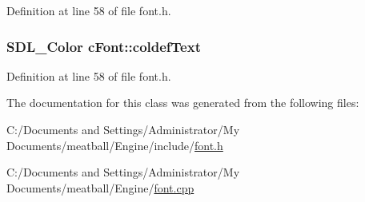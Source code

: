 Definition at line 58 of file font.\-h.

\hypertarget{classc_font_a96a95a892c62f8097c0da7388bc7b948}{
\subsubsection[{coldef\-Text}]{\setlength{\rightskip}{0pt plus 5cm}S\-D\-L\-\_\-\-Color c\-Font\-::coldef\-Text}}\label{classc_font_a96a95a892c62f8097c0da7388bc7b948}


Definition at line 58 of file font.\-h.



The documentation for this class was generated from the following files\-:\begin{DoxyCompactItemize}
\item 
C\-:/\-Documents and Settings/\-Administrator/\-My Documents/meatball/\-Engine/include/\hyperlink{font_8h}{font.\-h}\item 
C\-:/\-Documents and Settings/\-Administrator/\-My Documents/meatball/\-Engine/\hyperlink{font_8cpp}{font.\-cpp}\end{DoxyCompactItemize}
